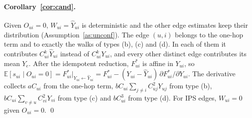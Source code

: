 \documentclass[preprint,review,12pt,authoryear]{elsarticle}
\theoremstyle{definition}
\newcommand{\E}{\mathbb{E}}
\begin{document}
\paragraph{Corollary~\ref{cor:cand}.}
Given $O_{ui}=0$, $W_{ui}=\hat Y_{ui}$ is deterministic and the other edge
estimates keep their distribution (Assumption~\ref{as:unconf}). The edge $(u,i)$
belongs to the one-hop term and to exactly the walks of types (b), (c) and (d).
In each of them it contributes $C_{ui}^{k}\hat Y_{ui}$ instead of $C_{ui}^kY_{ui}$,
and every other distinct edge contributes its mean $Y_e$. After the idempotent
reduction, $F^*_{ui}$ is affine in $Y_{ui}$, so
$\E[s_{ui}\mid O_{ui}=0]=F^*_{ui}|_{Y_{ui}\leftarrow\hat Y_{ui}}=F^*_{ui}-(Y_{ui}-\hat Y_{ui})\,\partial F^*_{ui}/\partial Y_{ui}$.
The derivative collects $aC_{ui}$ from the one-hop term,
$bC_{ui}\sum_{j\ne i}C_{uj}^2Y_{uj}$ from type (b),
$bC_{ui}\sum_{v\ne u}C_{vi}^2Y_{vi}$ from type (c) and $bC_{ui}^3$ from type (d).
For IPS edges, $W_{ui}=0$ given $O_{ui}=0$. \qed
\end{document}
